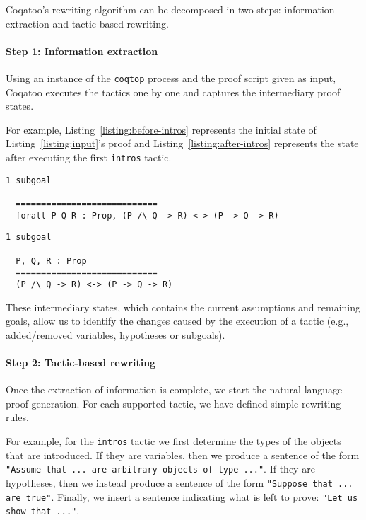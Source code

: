 \documentclass[sigplan,9pt]{acmart}\settopmatter{printfolios=true,printccs=false,printacmref=false}
\begin{document}
Coqatoo's rewriting algorithm can be decomposed in two steps: information extraction and tactic-based rewriting. 

\paragraph{Step 1: Information extraction}
Using an instance of the \texttt{coqtop} process and the proof script given as input, Coqatoo executes the tactics one by one and captures the intermediary proof states. 

For example, Listing~\ref{listing:before-intros} represents the initial state of Listing~\ref{listing:input}'s proof and Listing~\ref{listing:after-intros} represents the state after executing the first \lstinline{intros} tactic.
\begin{lstlisting}[label=listing:before-intros, captionpos=b,caption={State before executing the first intros tactic}]
  1 subgoal
  
  ============================
  forall P Q R : Prop, (P /\ Q -> R) <-> (P -> Q -> R)
\end{lstlisting}
\pagebreak
\begin{lstlisting}[label=listing:after-intros,captionpos=b,caption={State after executing the first intros tactic}]
  1 subgoal
  
  P, Q, R : Prop
  ============================
  (P /\ Q -> R) <-> (P -> Q -> R)
\end{lstlisting}
These intermediary states, which contains the current assumptions and remaining goals, allow us to identify the changes caused by the execution of a tactic (e.g., added/removed variables, hypotheses or subgoals).



\paragraph{Step 2: Tactic-based rewriting}
Once the extraction of information is complete, we start the natural language proof generation. For each supported tactic, we have defined simple rewriting rules. 

For example, for the \lstinline{intros} tactic we first determine the types of the objects that are introduced. If they are variables, then we produce a sentence of the form \lstinline{"Assume that ... are arbitrary objects of type ..."}. If they are hypotheses, then we instead produce a sentence of the form \lstinline{"Suppose that ... are true"}. Finally, we insert a sentence indicating what is left to prove: \lstinline{"Let us show that ..."}. 
\end{document}
